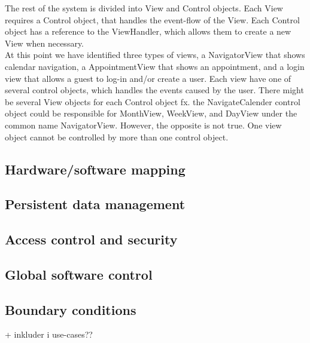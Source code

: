The rest of the system is divided into View and Control objects. Each View requires a Control object, that handles the event-flow of the View. Each Control object has a reference to the ViewHandler, which allows them to create a new View when necessary. \\

At this point we have identified three types of views, a NavigatorView that shows calendar navigation, a AppointmentView that shows an appointment, and a login view that allows a guest to log-in and/or create a user. Each view have one of several control objects, which handles the events caused by the user. There might be several View objects for each Control object fx. the NavigateCalender control object could be responsible for MonthView, WeekView, and DayView under the common name NavigatorView. However, the opposite is not true. One view object cannot be controlled by more than one control object. 

\subsection{Hardware/software mapping}


\subsection{Persistent data management}


\subsection{Access control and security}


\subsection{Global software control}


\subsection{Boundary conditions}


+ inkluder i use-cases??

